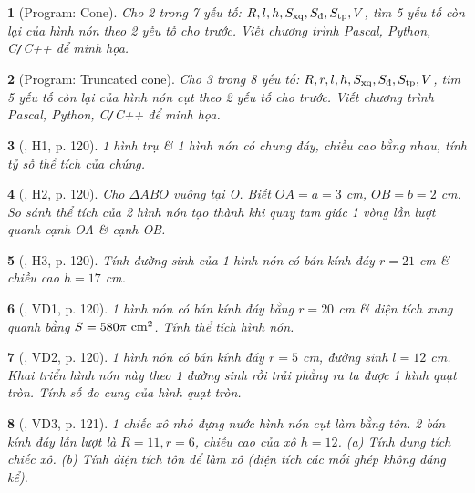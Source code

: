 \documentclass{article}
\newtheorem{baitoan}{}
\begin{document}
\begin{baitoan}[{\sf Program}: Cone]
	Cho 2 trong 7 yếu tố: $R,l,h,S_{\rm xq},S_{\scriptsize\mbox{\rm đ}},S_{\rm tp},V$, tìm 5 yếu tố còn lại của hình nón theo 2 yếu tố cho trước. Viết chương trình {\sf Pascal, Python, C{\tt/}C++} để minh họa.
\end{baitoan}

\begin{baitoan}[{\sf Program}: Truncated cone]
	Cho 3 trong 8 yếu tố: $R,r,l,h,S_{\rm xq},S_{\scriptsize\mbox{\rm đ}},S_{\rm tp},V$, tìm 5 yếu tố còn lại của hình nón cụt theo 2 yếu tố cho trước. Viết chương trình {\sf Pascal, Python, C{\tt/}C++} để minh họa.
\end{baitoan}

\begin{baitoan}[\cite{Binh_boi_duong_Toan_9_tap_2}, H1, p. 120]
	1 hình trụ \& 1 hình nón có chung đáy, chiều cao bằng nhau, tính tỷ số thể tích của chúng.
\end{baitoan}

\begin{baitoan}[\cite{Binh_boi_duong_Toan_9_tap_2}, H2, p. 120]
	Cho $\Delta ABO$ vuông tại O. Biết $OA = a = 3$ {\rm cm}, $OB = b = 2$ {\rm cm}. So sánh thể tích của 2 hình nón tạo thành khi quay tam giác 1 vòng lần lượt quanh cạnh OA \& cạnh OB.
\end{baitoan}

\begin{baitoan}[\cite{Binh_boi_duong_Toan_9_tap_2}, H3, p. 120]
	Tính đường sinh của 1 hình nón có bán kính đáy $r = 21$ {\rm cm} \& chiều cao $h = 17$ {\rm cm}.
\end{baitoan}

\begin{baitoan}[\cite{Binh_boi_duong_Toan_9_tap_2}, VD1, p. 120]
	1 hình nón có bán kính đáy bằng $r = 20$ {\rm cm} \& diện tích xung quanh bằng $S = 580\pi\ {\rm cm}^2$. Tính thể tích hình nón.
\end{baitoan}

\begin{baitoan}[\cite{Binh_boi_duong_Toan_9_tap_2}, VD2, p. 120]
	1 hình nón có bán kính đáy $r = 5$ {\rm cm}, đường sinh $l = 12$ {\rm cm}. Khai triển hình nón này theo 1 đường sinh rồi trải phẳng ra ta được 1 hình quạt tròn. Tính số đo cung của hình quạt tròn.
\end{baitoan}

\begin{baitoan}[\cite{Binh_boi_duong_Toan_9_tap_2}, VD3, p. 121]
	1 chiếc xô nhỏ đựng nước hình nón cụt làm bằng tôn. 2 bán kính đáy lần lượt là $R = 11,r = 6$, chiều cao của xô $h = 12$. (a) Tính dung tích chiếc xô. (b) Tính diện tích tôn để làm xô (diện tích các mối ghép không đáng kể).
\end{baitoan}
\end{document}
